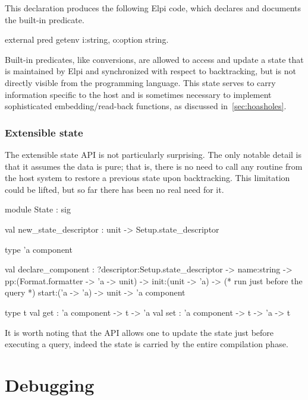 \documentclass{these-ISSS}
\newenvironment{elpicode}
  {\VerbatimEnvironment\begin{elpibox}\begin{xelpicode}}{\end{xelpicode}
\end{elpibox}}
\newenvironment{ocamlcode}
  {\VerbatimEnvironment\begin{ocamlbox}\begin{xocamlcode}}{\end{xocamlcode}
\end{ocamlbox}}
\begin{document}
\noindent
This declaration produces the following Elpi code, which declares and
documents the built-in predicate.

\begin{elpicode}
external pred getenv i:string, o:option string.
\end{elpicode}

Built-in predicates, like conversions, are allowed to access and update a
state that is maintained by Elpi and synchronized with respect to
backtracking, but is not directly visible from the programming language. This
state serves to carry information specific to the host and is sometimes necessary to
implement sophisticated embedding/read-back functions, as discussed
in~\cref{sec:hoasholes}.

\subsubsection{Extensible state}\label{sec:state}

The extensible state API is not particularly surprising. The only notable
detail is that it assumes the data is pure; that is, there is no need to call
any routine from the host system to restore a previous state upon
backtracking. This limitation could be lifted, but so far there has been no
real need for it.

\begin{ocamlcode}
module State : sig

  val new_state_descriptor : unit -> Setup.state_descriptor

  type 'a component

  val declare_component :
    ?descriptor:Setup.state_descriptor ->
    name:string ->
    pp:(Format.formatter -> 'a -> unit) ->
    init:(unit -> 'a) ->
    (* run just before the query *)
    start:('a -> 'a) ->
    unit ->
      'a component

  type t
  val get : 'a component -> t -> 'a
  val set : 'a component -> t -> 'a -> t
\end{ocamlcode}

\noindent
It is worth noting that the API allows one to update the state just before
executing a query, indeed the state is carried by the entire compilation
phase.

\section{Debugging}\label{sec:trace}
\end{document}
